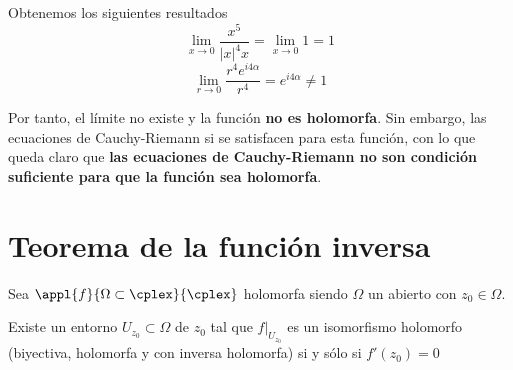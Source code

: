 \documentclass{apuntes}
\begin{document}
\begin{example}
\begin{enumerate}
Obtenemos los siguientes resultados
\[\lim_{x \to 0} \frac{x^5}{|x|^4x} = \lim_{x \to 0} 1 = 1\]
\[\lim_{r \to 0} \frac{r^4 e^{i4α}}{r^4} = e^{i4α} \neq 1\]

Por tanto, el límite no existe y la función \textbf{no es holomorfa}. Sin embargo, las ecuaciones de Cauchy-Riemann si se satisfacen para esta función, con lo que queda claro que \textbf{las ecuaciones de Cauchy-Riemann no son condición suficiente para que la función sea holomorfa}.
\end{enumerate}
\end{example}

\section{Teorema de la función inversa}
\begin{theorem}
Sea $\appl{f}{\Omega\subset \cplex}{\cplex}$ holomorfa siendo $\Omega$ un abierto con $z_0\in \Omega$.

Existe un entorno $U_{z_0}\subset \Omega$ de $z_0$ tal que $f|_{U_{z_0}}$ es un isomorfismo holomorfo (biyectiva, holomorfa y con inversa holomorfa) si y sólo si $f'(z_0)=0$
\end{theorem}
\end{document}
